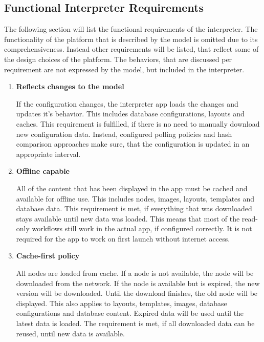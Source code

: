 \subsection{Functional Interpreter Requirements}
\label{functionalinterpreterrequirements}

The following section will list the functional requirements of the interpreter.
The functionality of the platform that is described by the model is omitted due to its comprehensiveness.
Instead other requirements will be listed, that reflect some of the design choices of the platform.
The behaviors, that are discussed per requirement are not expressed by the model, but included in the interpreter.

\begin{enumerate}
	\item \textbf{Reflects changes to the model}
	
	If the configuration changes, the interpreter app loads the changes and updates it's behavior. This includes database configurations, layouts and caches.
	This requirement is fulfilled, if there is no need to manually download new configuration data.
	Instead, configured polling policies and hash comparison approaches make sure, that the configuration is updated in an appropriate interval.
	
	\item \textbf{Offline capable}
	
	All of the content that has been displayed in the app must be cached and available for offline use.
	This includes nodes, images, layouts, templates and database data.
	This requirement is met, if everything that was downloaded stays available until new data was loaded.
	This means that most of the read-only workflows still work in the actual app, if configured correctly.
	It is not required for the app to work on first launch without internet access.
	
	\item \textbf{Cache-first policy}
	
	All nodes are loaded from cache.
	If a node is not available, the node will be downloaded from the network.
	If the node is available but is expired, the new version will be downloaded.
	Until the download finishes, the old node will be displayed.
	This also applies to layouts, templates, images, database configurations and database content.
	Expired data will be used until the latest data is loaded.
	The requirement is met, if all downloaded data can be reused, until new data is available.
	

\end{enumerate}
